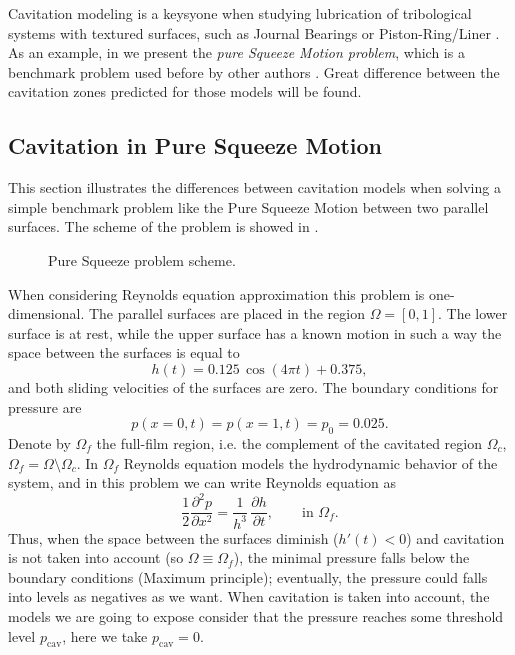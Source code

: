 Cavitation modeling is a keysyone when studying lubrication of tribological systems with textured surfaces, such as Journal Bearings or Piston-Ring/Liner \cite{priest2000,ausas07}. As an example, in  we present the \textit{pure Squeeze Motion problem}, which is a benchmark problem used before by other authors \cite{optasanu2000,ausas07}. Great difference between the cavitation zones predicted for those models will be found.
\subsection{Cavitation in Pure Squeeze Motion}\label{sec:cavitation_pure_squeeze}
This section illustrates the differences between cavitation models when solving a simple benchmark problem like the Pure Squeeze Motion between two parallel surfaces. The scheme of the problem is showed in .
\begin{figure}[h!]
\centering 
\def\svgwidth{\textwidth}	
\footnotesize{
\caption{Pure Squeeze problem scheme.}\label{fig:squeeze_scheme}}
\end{figure}

When considering Reynolds equation approximation this problem is one-dimensional. The parallel surfaces are placed in the region $\Omega=[0,1]$. The lower surface is at rest, while the upper surface has a known motion in such a way the space between the surfaces is equal to $$h(t)=0.125\,\cos(4\pi t)+0.375,$$ and both sliding velocities of the surfaces are zero. The boundary conditions for pressure are
\begin{equation}
p(x=0,t)=p(x=1,t)=p_0=0.025.\label{eq:bound_cond_squeeze}
\end{equation}
Denote by $\Omega_f$ the full-film region, i.e. the complement of the cavitated region $\Omega_c$, $\Omega_f=\Omega \setminus \Omega_c$. In $\Omega_f$ Reynolds equation models the hydrodynamic behavior of the system, and in this problem we can write Reynolds equation as $$\frac{1}{2}\frac{\partial^2 p}{\partial x^2}=\frac{1}{h^3}\,\frac{\partial h}{\partial t },\qquad \text{in }\Omega_f.$$
Thus, when the space between the surfaces diminish ($h'(t)<0$) and cavitation is not taken into account (so $\Omega\equiv \Omega_f$), the minimal pressure falls below the boundary conditions (Maximum principle); eventually, the pressure could falls into levels as negatives as we want. When cavitation is taken into account, the models we are going to expose consider that the pressure reaches some threshold level $p_\text{cav}$, here we take $p_\text{cav}=0$.

